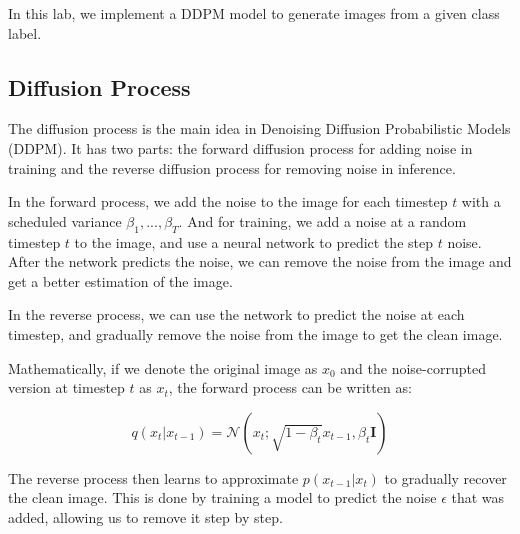 In this lab, we implement a DDPM model to generate images from a given class label.

\subsection{Diffusion Process}
The diffusion process is the main idea in Denoising Diffusion Probabilistic Models (DDPM). It has two parts: the forward diffusion process for adding noise in training and the reverse diffusion process for removing noise in inference.

In the forward process, we add the noise to the image for each timestep $t$ with a scheduled variance $\beta_1, ..., \beta_T$.
And for training, we add a noise at a random timestep $t$ to the image, and use a neural network to predict the step $t$ noise.
After the network predicts the noise, we can remove the noise from the image and get a better estimation of the image.

In the reverse process, we can use the network to predict the noise at each timestep, and gradually remove the noise from the image to get the clean image.

Mathematically, if we denote the original image as $x_0$ and the noise-corrupted version at timestep $t$ as $x_t$, the forward process can be written as:

\begin{equation}
q(x_t|x_{t-1}) = \mathcal{N}(x_t; \sqrt{1-\beta_t}x_{t-1}, \beta_t\mathbf{I})
\end{equation}

The reverse process then learns to approximate $p(x_{t-1}|x_t)$ to gradually recover the clean image. This is done by training a model to predict the noise $\epsilon$ that was added, allowing us to remove it step by step.
